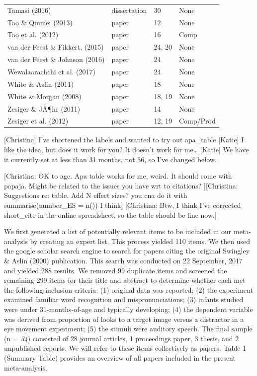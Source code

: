 \documentclass[man]{apa6}
\theoremstyle{definition}
\theoremstyle{definition}
\theoremstyle{definition}
\theoremstyle{remark}
\begin{document}
\begin{table}[tbp]
\begin{center}
\begin{threeparttable}
\begin{tabular}{llll}
Tamasi (2016) & dissertation & 30 & None\\
Tao \& Qinmei (2013) & paper & 12 & None\\
Tao et al. (2012) & paper & 16 & Comp\\
van der Feest \& Fikkert, (2015) & paper & 24, 20 & None\\
van der Feest \& Johnson (2016) & paper & 24 & None\\
Wewalaarachchi et al. (2017) & paper & 24 & None\\
White \& Aslin (2011) & paper & 18 & None\\
White \& Morgan (2008) & paper & 18, 19 & None\\
Zesiger \& JÃ¶hr (2011) & paper & 14 & None\\
Zesiger et al. (2012) & paper & 12, 19 & Comp/Prod\\
\bottomrule
\end{tabular}
\end{threeparttable}
\end{center}
\end{table}

{[}Christina{]} I've shortened the labels and wanted to try out
apa\_table {[}Katie{]} I like the idea, but does it work for you? It
doesn't work for me\ldots{} {[}Katie{]} We have it currently set at less
than 31 months, not 36, so I've changed below.

{[}Christina: OK to age. Apa table works for me, weird. It should come
with papaja. Might be related to the issues you have wrt to citations?
{]}{[}Christina: Suggestions re: table. Add N effect sizes? you cna do
it with summarise(number\_ES = n()) I think{]} {[}Christina: Btw, I
think I've corrected short\_cite in the online spreadsheet, so the table
should be fine now.{]}

We first generated a list of potentially relevant items to be included
in our meta-analysis by creating an expert list. This process yielded
110 items. We then used the google scholar search engine to search for
papers citing the original Swingley \& Aslin (2000) publication. This
search was conducted on 22 September, 2017 and yielded 288 results. We
removed 99 duplicate items and screened the remaining 299 items for
their title and abstract to determine whether each met the following
inclusion criteria: (1) original data was reported; (2) the experiment
examined familiar word recognition and mispronunciations; (3) infants
studied were under 31-months-of-age and typically developing; (4) the
dependent variable was derived from proportion of looks to a target
image versus a distractor in a eye movement experiment; (5) the stimuli
were auditory speech. The final sample (n = \emph{34}) consisted of 28
journal articles, 1 proceedings paper, 3 thesis, and 2 unpublished
reports. We will refer to these items collectively as papers. Table 1
(Summary Table) provides an overview of all papers included in the
present meta-analysis.
\end{document}
